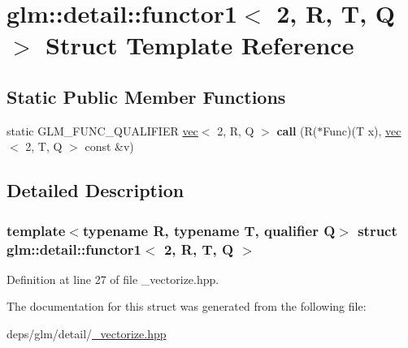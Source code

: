 \hypertarget{structglm_1_1detail_1_1functor1_3_012_00_01R_00_01T_00_01Q_01_4}{}\section{glm\+:\+:detail\+:\+:functor1$<$ 2, R, T, Q $>$ Struct Template Reference}
\label{structglm_1_1detail_1_1functor1_3_012_00_01R_00_01T_00_01Q_01_4}
\subsection*{Static Public Member Functions}
\begin{DoxyCompactItemize}
\item 
\mbox{\label{structglm_1_1detail_1_1functor1_3_012_00_01R_00_01T_00_01Q_01_4_a99959412228366dac1483414dcde0092}} 
static G\+L\+M\+\_\+\+F\+U\+N\+C\+\_\+\+Q\+U\+A\+L\+I\+F\+I\+ER \hyperlink{structglm_1_1vec}{vec}$<$ 2, R, Q $>$ {\bfseries call} (R($\ast$Func)(T x), \hyperlink{structglm_1_1vec}{vec}$<$ 2, T, Q $>$ const \&v)
\end{DoxyCompactItemize}


\subsection{Detailed Description}
\subsubsection*{template$<$typename R, typename T, qualifier Q$>$\newline
struct glm\+::detail\+::functor1$<$ 2, R, T, Q $>$}



Definition at line 27 of file \+\_\+vectorize.\+hpp.



The documentation for this struct was generated from the following file\+:\begin{DoxyCompactItemize}
\item 
deps/glm/detail/\hyperlink{__vectorize_8hpp}{\+\_\+vectorize.\+hpp}\end{DoxyCompactItemize}
